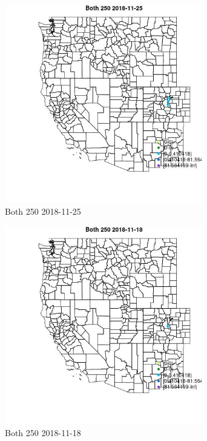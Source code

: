 \begin{figure} 
\centering  
\includegraphics[width=0.77\textwidth]{Code_Outputs/Report_ML_input_PM25_Step4_part_e_de_duplicated_aveswNAs_MapObsBoth_2502018-11-25.jpg} 
\caption{\label{fig:Report_ML_input_PM25_Step4_part_e_de_duplicated_aveswNAsMapObsBoth_2502018-11-25}Both 250 2018-11-25} 
\end{figure} 
 

\begin{figure} 
\centering  
\includegraphics[width=0.77\textwidth]{Code_Outputs/Report_ML_input_PM25_Step4_part_e_de_duplicated_aveswNAs_MapObsBoth_2502018-11-18.jpg} 
\caption{\label{fig:Report_ML_input_PM25_Step4_part_e_de_duplicated_aveswNAsMapObsBoth_2502018-11-18}Both 250 2018-11-18} 
\end{figure} 
 

